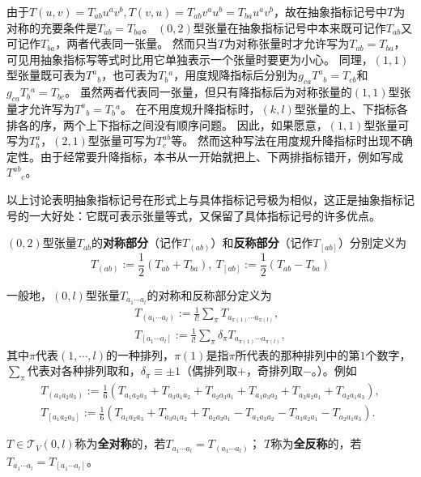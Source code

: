 由于$T(u, v) = T_{ab}u^av^b, T(v, u) = T_{ab}v^au^b = T_{ba}u^av^b$，故在抽象指标记号中$T$为对称的充要条件是$T_{ab} = T_{ba}$。
$(0, 2)$型张量在抽象指标记号中本来既可记作$T_{ab}$又可记作$T_{ba}$，两者代表同一张量。
然而只当$T$为对称张量时才允许写为$T_{ab} = T_{ba}$，可见用抽象指标写等式时比用它单独表示一个张量时要更为小心。
同理，$(1, 1)$型张量既可表为$T^a{}_b$，也可表为$T_b{}^a$，用度规降指标后分别为$g_{ca}T^a{}_b = T_{cb}$和$g_{ca}T_b{}^a = T_{bc}$。
虽然两者代表同一张量，但只有降指标后为对称张量的$(1, 1)$型张量才允许写为$T^a{}_b = T_b{}^a$。
在不用度规升降指标时，$(k, l)$型张量的上、下指标各排各的序，两个上下指标之间没有顺序问题。
因此，如果愿意，$(1, 1)$型张量可写为$T^a_b$，$(2, 1)$型张量可写为$T^{ab}_c$等。
然而这种写法在用度规升降指标时出现不确定性。由于经常要升降指标，本书从一开始就把上、下两排指标错开，例如写成$T^{ab}{}_c$。

以上讨论表明抽象指标记号在形式上与具体指标记号极为相似，这正是抽象指标记号的一大好处：它既可表示张量等式，又保留了具体指标记号的许多优点。

\begin{definition}
$(0, 2)$型张量$T_{ab}$的\textbf{对称部分}（记作$T_{(ab)}$）和\textbf{反称部分}（记作$T_{[ab]}$）分别定义为
$$T_{(ab)} := \frac{1}{2}(T_{ab} + T_{ba}), ~ T_{[ab]} := \frac{1}{2}(T_{ab} - T_{ba})$$
\end{definition}

一般地，$(0, l)$型张量$T_{a_1 \cdots a_l}$的对称和反称部分定义为
\begin{gather*}
T_{(a_1 \cdots a_l)} := \frac{1}{l!}\sum_\pi T_{a_{\pi(1)} \cdots a_{\pi(l)}}, \\
T_{[a_1 \cdots a_l]} := \frac{1}{l!}\sum_\pi \delta_\pi T_{a_{\pi(1)} \cdots a_{\pi(l)}},
\end{gather*}
其中$\pi$代表$(1, \cdots, l)$的一种排列，$\pi(1)$是指$\pi$所代表的那种排列中的第$1$个数字，$\sum\limits_\pi$代表对各种排列取和，$\delta_\pi \equiv \pm 1$（偶排列取$+$，奇排列取$-$。）。例如
\begin{gather*}
T_{(a_1 a_2 a_3)} := \frac{1}{6}(T_{a_1a_2a_3} + T_{a_3a_1a_2} + T_{a_2a_3a_1} + T_{a_1a_3a_2} + T_{a_3a_2a_1} + T_{a_2a_1a_3}), \\
T_{[a_1 a_2 a_3]} := \frac{1}{6}(T_{a_1a_2a_3} + T_{a_3a_1a_2} + T_{a_2a_3a_1} - T_{a_1a_3a_2} - T_{a_3a_2a_1} - T_{a_2a_1a_3}).
\end{gather*}

\begin{definition}
$T \in \mathscr{T}_V(0, l)$称为\textbf{全对称}的，若$T_{a_1 \cdots a_l} = T_{(a_1 \cdots a_l)}$；
$T$称为\textbf{全反称}的，若$T_{a_1 \cdots a_l} = T_{[a_1 \cdots a_l]}$。
\end{definition}

